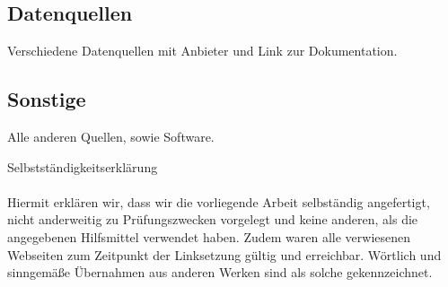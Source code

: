 \documentclass[a4paper,oneside,10pt,titlepage]{article}
\begin{document}
\subsection{Datenquellen}
Verschiedene Datenquellen mit Anbieter und Link zur Dokumentation.
\subsection{Sonstige}
Alle anderen Quellen, sowie Software.

\newpage
\Large{Selbstständigkeitserklärung}\\
\\
\small Hiermit erklären wir, dass wir die vorliegende Arbeit selbständig angefertigt, nicht anderweitig zu Prüfungszwecken vorgelegt und keine anderen, als die angegebenen Hilfsmittel verwendet haben. Zudem waren alle verwiesenen Webseiten zum Zeitpunkt der Linksetzung gültig und erreichbar. Wörtlich und sinngemäße Übernahmen aus anderen Werken sind als solche gekennzeichnet.
\\ 
\end{document}
